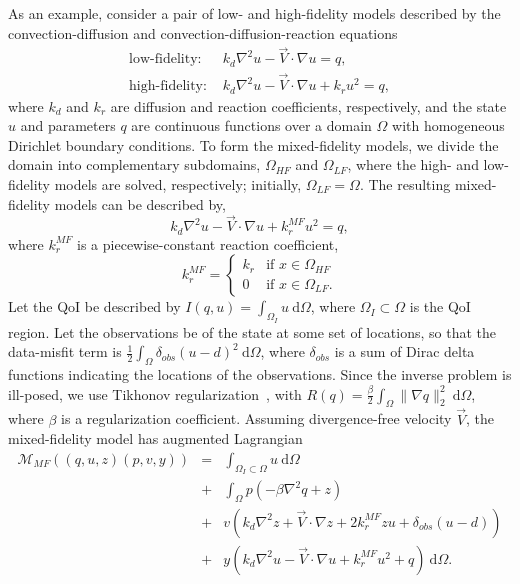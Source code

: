 \documentclass[review,sort&compress]{elsarticle}
\begin{document}
As an example, consider a pair of low- and high-fidelity models described by the convection-diffusion and convection-diffusion-reaction equations
\begin{subequations}
\begin{align}
\textrm{low-fidelity:   } & k_d\nabla^2 u - \vec{V}\cdot\nabla u = q, \label{eq:cdvcdrLF}\\
\textrm{high-fidelity:   } & k_d\nabla^2 u - \vec{V}\cdot\nabla u + k_ru^2 = q, \label{eq:cdvcdrHF}
\end{align}
\end{subequations}
where $k_d$ and $k_r$ are diffusion and reaction coefficients, respectively, and the state $u$ and parameters $q$ are continuous functions over a domain $\Omega$ with homogeneous Dirichlet boundary conditions. To form the mixed-fidelity models, we divide the domain into complementary subdomains, $\Omega_{HF}$ and $\Omega_{LF}$, where the high- and low-fidelity models are solved, respectively; initially, $\Omega_{LF}=\Omega$. The resulting mixed-fidelity models can be described by,
%
\begin{equation}
k_d\nabla^2 u - \vec{V}\cdot\nabla u + k^{MF}_ru^2= q,
\end{equation}
%
where $k^{MF}_r$ is a piecewise-constant reaction coefficient,
%
\begin{equation}
k^{MF}_r=
\begin{cases}
k_r & \textrm{if }x\in\Omega_{HF} \\
0 & \textrm{if }x\in\Omega_{LF}.
\end{cases}
\end{equation}
%
Let the QoI be described by $I(q,u)=\int_{\Omega_I} u \:\textrm{d}\Omega$, where $\Omega_I\subset\Omega$ is the QoI region. Let the observations be of the state at some set of locations, so that the data-misfit term is $\frac{1}{2}\int_\Omega \delta_{obs}(u-d)^2\:\textrm{d}\Omega$, where $\delta_{obs}$ is a sum of Dirac delta functions indicating the locations of the observations. Since the inverse problem is ill-posed, we use Tikhonov regularization~\cite{EngHanNeu00}, with $R(q)=\frac{\beta}{2}\int_\Omega \|\nabla q\|_2^2\:\textrm{d}\Omega$, where $\beta$ is a regularization coefficient. Assuming divergence-free velocity $\vec{V}$, the mixed-fidelity model has augmented Lagrangian
\begin{eqnarray}
\mathcal{M}_{MF}((q,u,z)(p,v,y)) &=& \int_{\Omega_I\subset\Omega} u \:\textrm{d}\Omega \nonumber\\
&+& \int_\Omega p(-\beta\nabla^2q+z) \nonumber\\
&+& v(k_d\nabla^2z+\vec{V}\cdot\nabla z+2k^{MF}_rzu+\delta_{obs}(u-d)) \nonumber\\ 
&+& y(k_d\nabla^2u-\vec{V}\cdot\nabla u+k^{MF}_ru^2+q)\:\textrm{d}\Omega.
\end{eqnarray}
\end{document}
